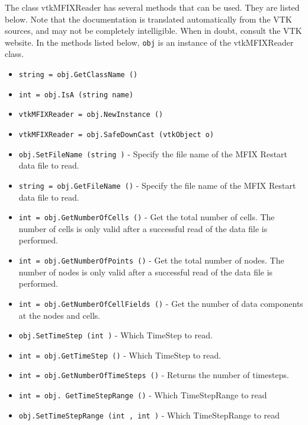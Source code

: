 The class vtkMFIXReader has several methods that can be used.
  They are listed below.
Note that the documentation is translated automatically from the VTK sources,
and may not be completely intelligible.  When in doubt, consult the VTK website.
In the methods listed below, \verb|obj| is an instance of the vtkMFIXReader class.
\begin{itemize}
\item  \verb|string = obj.GetClassName ()|

\item  \verb|int = obj.IsA (string name)|

\item  \verb|vtkMFIXReader = obj.NewInstance ()|

\item  \verb|vtkMFIXReader = obj.SafeDownCast (vtkObject o)|

\item  \verb|obj.SetFileName (string )| -  Specify the file name of the MFIX Restart data file to read.

\item  \verb|string = obj.GetFileName ()| -  Specify the file name of the MFIX Restart data file to read.

\item  \verb|int = obj.GetNumberOfCells ()| -  Get the total number of cells. The number of cells is only valid after a
 successful read of the data file is performed.

\item  \verb|int = obj.GetNumberOfPoints ()| -  Get the total number of nodes. The number of nodes is only valid after a
 successful read of the data file is performed.

\item  \verb|int = obj.GetNumberOfCellFields ()| -  Get the number of data components at the nodes and cells.

\item  \verb|obj.SetTimeStep (int )| -  Which TimeStep to read.

\item  \verb|int = obj.GetTimeStep ()| -  Which TimeStep to read.

\item  \verb|int = obj.GetNumberOfTimeSteps ()| -  Returns the number of timesteps.

\item  \verb|int = obj. GetTimeStepRange ()| -  Which TimeStepRange to read

\item  \verb|obj.SetTimeStepRange (int , int )| -  Which TimeStepRange to read


\end{itemize}
